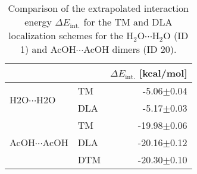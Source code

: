 \begin{table}
\caption{\label{tab:loc_scheme_test}Comparison of the extrapolated interaction energy $\Delta E_\text{int.}$ for the TM and DLA localization schemes for the H$_2$O$\cdots$H$_2$O (ID 1) and AcOH$\cdots$AcOH dimers (ID 20).}
\begin{adjustbox}{center}
\begin{tabular}{llr}
\toprule
 &  & $\Delta E_\text{int.}$ [kcal/mol] \\ 
\midrule
\multirow[t]{2}{*}{H2O$\cdots$H2O} & TM & -5.06$\pm$0.04 \\
 & DLA & -5.17$\pm$0.03 \\
\cline{1-3}
\multirow[t]{3}{*}{AcOH$\cdots$AcOH} & TM & -19.98$\pm$0.06 \\
 & DLA & -20.16$\pm$0.12 \\
 & DTM & -20.30$\pm$0.10 \\
\cline{1-3}
\bottomrule
\end{tabular}
\end{adjustbox}
\end{table}